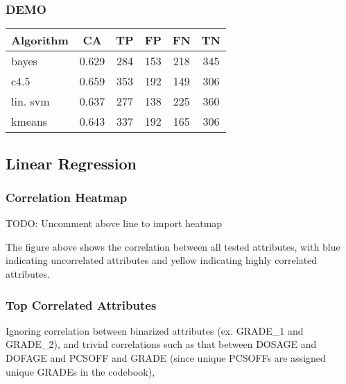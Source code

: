 \documentclass[]{article}
\begin{document}
\subsubsection{DEMO}
\begin{tabular}{|l|c|c|c|c|c|}
\hline
Algorithm & CA & TP & FP & FN & TN \\
\hline
bayes  &  0.629 & 284  &  153  &  218  &  345  \\
c4.5   &  0.659 & 353  &  192  &  149  &  306  \\
lin. svm & 0.637 & 277  &  138  &  225  &  360  \\
kmeans  & 0.643 & 337  &  192  &  165  &  306  \\
\hline
\end{tabular}

\subsection{Linear Regression}

\subsubsection{Correlation Heatmap}

TODO: Uncomment above line to import heatmap

The figure above shows the correlation between all tested attributes, 
with blue indicating uncorrelated attributes and yellow indicating highly correlated attributes.

\subsubsection{Top Correlated Attributes}
Ignoring correlation between binarized attributes (ex. GRADE\_1 and GRADE\_2), 
and trivial correlations such as that between DOSAGE and DOFAGE and PCSOFF and GRADE (since unique PCSOFFs are assigned unique GRADEs in the codebook),
\end{document}
